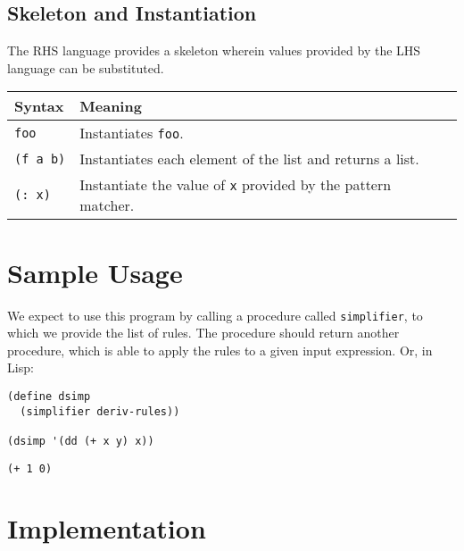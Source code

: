 \documentclass[9pt]{report}
\begin{document}
\subsection{Skeleton and Instantiation}
\label{sec:org8ad93b7}
The RHS language provides a skeleton wherein values provided by
the LHS language can be substituted.

\begin{center}
\begin{tabular}{ll}
\toprule
Syntax & Meaning\\
\midrule
\texttt{foo} & Instantiates \texttt{foo}.\\
\texttt{(f a b)} & Instantiates each element of the list and returns a list.\\
\texttt{(: x)} & Instantiate the value of \texttt{x} provided by the pattern matcher.\\
\bottomrule
\end{tabular}
\end{center}

\section{Sample Usage}
\label{sec:orgb5bf581}

We expect to use this program by calling a procedure called
\texttt{simplifier}, to which we provide the list of rules. The procedure
should return another procedure, which is able to apply the rules
to a given input expression. Or, in Lisp:

\begin{verbatim}
(define dsimp
  (simplifier deriv-rules))

(dsimp '(dd (+ x y) x))
\end{verbatim}

\begin{verbatim}
(+ 1 0)
\end{verbatim}

\section{Implementation}
\label{sec:org2be43ae}
\end{document}
